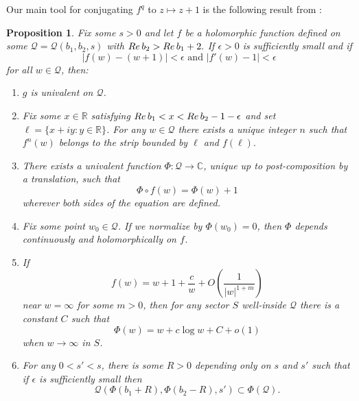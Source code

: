 \documentclass[12pt,letterpaper]{amsart}
\numberwithin{equation}{section}
\newtheorem{prop}[equation]{Proposition}
\theoremstyle{remark}
\theoremstyle{definition}
\newcommand{\QQ}{\mathcal Q}
\begin{document}
	
	Our main tool for conjugating $f^q$ to $z\mapsto z+1$ is the following result from \cite{shishikura_1}:
	\begin{prop}\label{fatou coordinates}
		Fix some $s>0$ and let $f$ be a holomorphic function defined on some ${\QQ}={\QQ}(b_1, b_2, s)$ with $\emph{Re}\,b_2>\emph{Re}\,b_1+2.$ If $\epsilon>0$ is sufficiently small and if 
		$$|f(w)-(w+1)|< \epsilon\text{ and }|f'(w)-1|< \epsilon$$
		for all $w\in {\QQ}$, then:
		\begin{enumerate}
			\item $g$ is univalent on ${\QQ}$.
			\item Fix some  $x\in \mathbb{R}$ satisfying $\emph{Re}\, b_1< x< \emph{Re}\, b_2-1-\epsilon$ and set $\ell = \{x+iy:y\in \mathbb{R}\}$. For any $w\in \mathcal{Q}$ there exists a unique integer $n$ such that $f^n(w)$ belongs to the strip bounded by $\ell$ and $f(\ell).$
			\item There exists a univalent function $\Phi:{\QQ}\to \mathbb{C}$, unique up to post-composition by a translation, such that
			$$\Phi\circ f(w)= \Phi(w)+1$$
			wherever both sides of the equation are defined.
			\item Fix some point $w_0\in \mathcal{Q}$. If we normalize by $\Phi(w_0)=0$, then $\Phi$ depends continuously and holomorphically on $f$. 
			\item If $$f(w) = w+1+\frac{c}{w}+O\left(\frac{1}{|w|^{1+m}}\right)$$
			near $w=\infty$ for some $m>0$, then for any sector $S$ well-inside $\QQ$ there is a constant $C$ such that 
			$$\Phi(w) = w+c\log w+C+o(1)$$
			when $w\to \infty$ in $S$.
			\item For any $0< s'< s$, there is some $R>0$ depending only on $s$ and $s'$ such that if $\epsilon$ is sufficiently small then 
			 $$\QQ(\Phi(b_1+R), \Phi(b_2-R), s')\subset \Phi(\QQ).$$
		\end{enumerate}
	\end{prop}
\end{document}
